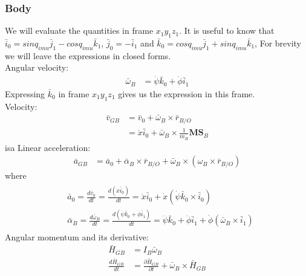 \documentclass[a4paper,10pt]{article}
\begin{document}
\subsubsection{Body}
We will evaluate the quantities in frame $x_1y_1z_1$. It is useful to know that $\bar{i}_0=sinq_{imu}\bar{j}_1-cosq_{imu}\bar{k}_1$,
$\bar{j}_0=-\bar{i}_1$ and $\bar{k}_0=cosq_{imu}\bar{j}_1+sinq_{imu}\bar{k}_1$,
For brevity we will leave the expressions in closed forms.\\
Angular velocity:
\begin{align}
 \bar{\omega}_B &= \dot\psi\bar{k}_0 + \dot\phi\bar{i}_1 
\end{align}
Expressing $\bar{k}_0$ in frame $x_1y_1z_1$ gives us the expression in this frame.
\\Velocity:
\begin{align}
  \bar{v}_{GB} &= \bar{v}_0 + \bar{\omega}_B \times \bar{r}_{B/O} \nonumber \\
  &= \dot{x}\bar{i}_0 + \bar{\omega}_B \times \frac{1}{m_B}\mathbf{MS}_{B} 
\end{align}isa
Linear acceleration:
\begin{align}
 \bar{a}_{GB} &= \bar{a}_0 + \bar\alpha_B \times \bar{r}_{B/O} + \bar\omega_B \times \left( \omega_B \times \bar{r}_{B/O}\right) 
\end{align}
where 
\begin{align} \begin{split}
 &\bar{a}_0 = \frac{d\bar{v}_0}{dt} = \frac{d\left(\dot{x}\bar{i}_0\right)}{dt} 
 = \ddot{x}\bar{i}_0+\dot{x}\left(\dot\psi\bar{k}_0 \times \bar{i}_0\right)  \\
 &\bar\alpha_B = \frac{d\bar{\omega}_B}{dt} = \frac{d\left(\dot\psi\bar{k}_0 + \dot\phi\bar{i}_1 \right)}{dt}
 = \ddot\psi\bar{k}_0 + \ddot\phi\bar{i}_1 + \dot\phi\left(\bar\omega_B \times \bar{i}_1\right) \label{a0alphaB}
\end{split} \end{align}
Angular momentum and its derivative:
\begin{align}
 \bar{H}_{GB} &= I_B\bar{\omega}_B \nonumber \\
 \frac{d\bar{H}_{GB}}{dt} &= \frac{\partial \bar{H}_{GB}}{\partial t} + \bar\omega_B \times \bar{H}_{GB} \label{kanesLHSVariableEnd}
\end{align}
\end{document}
